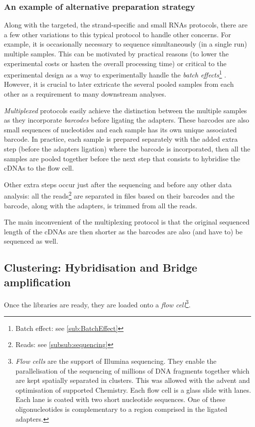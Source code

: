 \subsubsection{An example of alternative preparation strategy}
Along with the targeted, the strand-specific and small \glspl{RNA} protocols,
there are a few other variations to this typical protocol to handle other concerns.
For example, it is occasionally necessary to sequence simultaneously (in a single
run) multiple samples. This can be motivated by practical reasons
(to lower the experimental costs or hasten the overall processing time)
 or critical to the experimental design as a way to
experimentally handle the \emph{batch effects}\footnote{Batch effect: see
\cref{sub:BatchEffect}} . However, it is
crucial to later extricate the several pooled samples from each other as a
requirement to many downstream analyses.

\emph{Multiplexed} protocols easily achieve
the distinction between the multiple samples as they incorporate \emph{barcodes}
before ligating the adapters. These barcodes are also small sequences of
nucleotides and each sample has its own unique associated
barcode. In practice, each sample is prepared separately with the added extra
step (before the adapters ligation) where the barcode is incorporated, then all
the samples are pooled together before the next step that consists to hybridise
the \glspl{cDNA} to the flow cell.

Other extra steps occur just after the sequencing and before any other data
analysis: all the reads\footnote{Reads: see \cref{subsub:sequencing}} are
separated in files based on their barcodes and the barcode, along with the
adapters, is trimmed from all the reads.

The main inconvenient of the multiplexing protocol is that the original sequenced
length of the \glspl{cDNA} are then shorter as the barcodes are also (and have
to) be sequenced as well.

\subsection[Clustering: Hybridisation and Bridge amplification]{Clustering:
Hybridisation and Bridge amplification }
\label{sub:HybridClustAmp}

Once the libraries are ready, they are loaded onto a \emph{flow cell}\footnote{%
\emph{Flow cells} are the support of Illumina sequencing. They enable the
parallelisation of the sequencing of millions of \gls{DNA} fragments together
which are kept spatially separated in clusters. This was allowed with the advent
and optimisation of supported Chemistry. Each flow cell is a glass slide with
lanes. Each lane is coated with two short nucleotide sequences. One of these
oligonucleotides is complementary to a region comprised in the ligated adapters.}.

